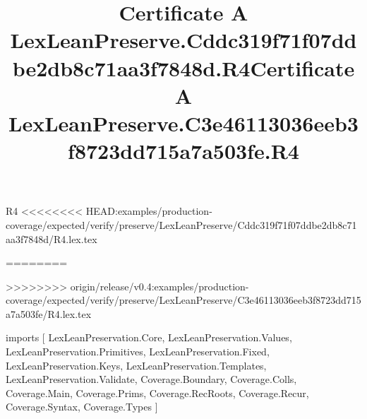 \begin{lexlean}{R4}
<<<<<<<< HEAD:examples/production-coverage/expected/verify/preserve/LexLeanPreserve/Cddc319f71f07ddbe2db8c71aa3f7848d/R4.lex.tex
\title{Certificate A LexLeanPreserve.Cddc319f71f07ddbe2db8c71aa3f7848d.R4}
========
\title{Certificate A LexLeanPreserve.C3e46113036eeb3f8723dd715a7a503fe.R4}
>>>>>>>> origin/release/v0.4:examples/production-coverage/expected/verify/preserve/LexLeanPreserve/C3e46113036eeb3f8723dd715a7a503fe/R4.lex.tex
\begin{coremodule}
imports [
  LexLeanPreservation.Core,
  LexLeanPreservation.Values,
  LexLeanPreservation.Primitives,
  LexLeanPreservation.Fixed,
  LexLeanPreservation.Keys,
  LexLeanPreservation.Templates,
  LexLeanPreservation.Validate,
  Coverage.Boundary,
  Coverage.Colls,
  Coverage.Main,
  Coverage.Prims,
  Coverage.RecRoots,
  Coverage.Recur,
  Coverage.Syntax,
  Coverage.Types
]


\end{coremodule}
\end{lexlean}

